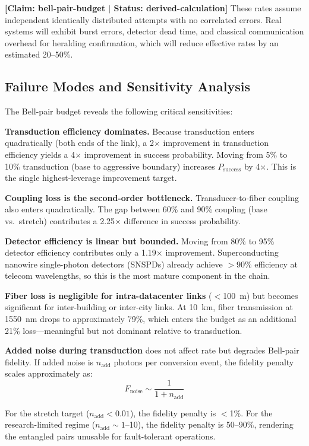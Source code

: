 \documentclass[conference]{IEEEtran}
\begin{document}
\textbf{[Claim: bell-pair-budget $|$ Status: derived-calculation]} These rates assume independent identically distributed attempts with no correlated errors. Real systems will exhibit burst errors, detector dead time, and classical communication overhead for heralding confirmation, which will reduce effective rates by an estimated 20--50\%.

\subsection{Failure Modes and Sensitivity Analysis}

The Bell-pair budget reveals the following critical sensitivities:

\textbf{Transduction efficiency dominates.} Because transduction enters quadratically (both ends of the link), a 2$\times$ improvement in transduction efficiency yields a 4$\times$ improvement in success probability. Moving from 5\% to 10\% transduction (base to aggressive boundary) increases $P_{\text{success}}$ by 4$\times$. This is the single highest-leverage improvement target.

\textbf{Coupling loss is the second-order bottleneck.} Transducer-to-fiber coupling also enters quadratically. The gap between 60\% and 90\% coupling (base vs.\ stretch) contributes a 2.25$\times$ difference in success probability.

\textbf{Detector efficiency is linear but bounded.} Moving from 80\% to 95\% detector efficiency contributes only a 1.19$\times$ improvement. Superconducting nanowire single-photon detectors (SNSPDs) already achieve $>$90\% efficiency at telecom wavelengths, so this is the most mature component in the chain.

\textbf{Fiber loss is negligible for intra-datacenter links} ($<$100~m) but becomes significant for inter-building or inter-city links. At 10~km, fiber transmission at 1550~nm drops to approximately 79\%, which enters the budget as an additional 21\% loss---meaningful but not dominant relative to transduction.

\textbf{Added noise during transduction} does not affect rate but degrades Bell-pair fidelity. If added noise is $n_{\text{add}}$ photons per conversion event, the fidelity penalty scales approximately as:
\begin{equation}
F_{\text{noise}} \sim \frac{1}{1 + n_{\text{add}}}
\end{equation}

For the stretch target ($n_{\text{add}} < 0.01$), the fidelity penalty is $<$1\%. For the research-limited regime ($n_{\text{add}} \sim 1$--10), the fidelity penalty is 50--90\%, rendering the entangled pairs unusable for fault-tolerant operations.
\end{document}
